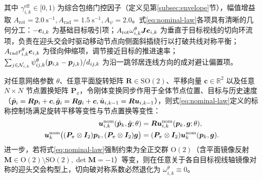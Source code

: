 其中 $\gamma_{i,k}^{\mathrm{eff}}\in[0,1)$ 为综合包络门控因子（定义见第\ref{subsec:envelope}节），幅值增益取 $A_{\mathrm{rot}}=2.0\ \mathrm s^{-1},A_{\mathrm{rad}}=1.5\ \mathrm s^{-1},A_\psi=2.0$。式\eqref{eq:nominal-law}各项具有清晰的几何分工：$-\boldsymbol{e}_{i,k}$ 为基础目标吸引项；$A_{\mathrm{rot}}\omega_{i,k}^\theta\boldsymbol{J}\boldsymbol{e}_{i,k}$ 为垂直于目标视线的切向环流项，负责在迎头交会时驱动移动节点向侧面斜插绕行以打破共线对称平衡；$A_{\mathrm{rad}}r_{i,k}^\theta\boldsymbol{e}_{i,k}$ 为径向伸缩项，调节接近目标的推进速率；$\sum_{j\in\mathcal N_{i,k}}\psi_{ij,k}^\theta(\boldsymbol{p}_{i,k}-\boldsymbol{p}_{j,k})/d_{ij,k}$ 为沿一跳邻居连线方向的成对避让偏置项。

\begin{proposition}[标称控制场的平面刚体变换与置换等变性及手性破缺机理]\label{prop:equivariance}
对任意网络参数 $\theta$、任意平面旋转矩阵 $\boldsymbol R\in\mathrm{SO}(2)$、平移向量 $\boldsymbol c\in\mathbb R^2$ 以及任意 $N\times N$ 节点置换矩阵 $\boldsymbol P_\pi$，令刚体变换同步作用于全体节点位置、目标与历史速度（$\tilde{\boldsymbol{p}}_i=\boldsymbol R\boldsymbol{p}_i+\boldsymbol c,\tilde{\boldsymbol{g}}_i=\boldsymbol R\boldsymbol{g}_i+\boldsymbol c,\tilde{\boldsymbol{u}}_{i,k-1}=\boldsymbol R\boldsymbol{u}_{i,k-1}$），则式\eqref{eq:nominal-law}定义的标称控制场满足旋转平移等变性与节点置换等变性：
\begin{equation}
\begin{split}
 \boldsymbol{u}_{i,k}^{\mathrm{nom}}(\tilde{\boldsymbol{p}}_k,\tilde{\boldsymbol{g}};\theta)&=\boldsymbol R\boldsymbol{u}_{i,k}^{\mathrm{nom}}(\boldsymbol{p}_k,\boldsymbol{g};\theta),\\
 \boldsymbol{u}_k^{\mathrm{nom}}\big((\boldsymbol P_\pi\otimes\boldsymbol{I}_2)\boldsymbol{p}_k,(\boldsymbol P_\pi\otimes\boldsymbol{I}_2)\boldsymbol{g}\big)&=(\boldsymbol P_\pi\otimes\boldsymbol{I}_2)\boldsymbol{u}_k^{\mathrm{nom}}(\boldsymbol{p}_k,\boldsymbol{g}).
\end{split}\label{eq:equiv-prop}
\end{equation}
进一步，若将式\eqref{eq:nominal-law}强制约束为全正交群 $\mathrm{O}(2)$（含平面镜像反射 $\boldsymbol M\in\mathrm{O}(2)\setminus\mathrm{SO}(2),\det\boldsymbol M=-1$）等变，则在任意关于各自目标视线轴镜像对称的迎头交会构型上，切向破对称系数必然退化为 $\omega_{i,k}^\theta\equiv 0$。
\end{proposition}
